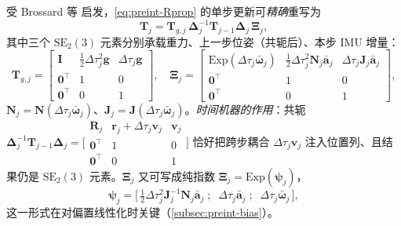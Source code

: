 \begin{derivation}
\label{deriv:preint-triple}
受 Brossard 等\cite{brossard2021associating} 启发，\cref{eq:preint-Rprop} 的单步更新可\emph{精确}重写为
\begin{equation}
  \mathbf{T}_j=\mathbf{T}_{g,j}\,\boldsymbol{\Delta}_j^{-1}\mathbf{T}_{j-1}\boldsymbol{\Delta}_j\,\boldsymbol{\Xi}_j,
  \label{eq:preint-meanprop}
\end{equation}
其中三个 $\mathrm{SE}_2(3)$ 元素分别承载重力、上一步位姿（共轭后）、本步 IMU 增量：
\begin{equation}
  \mathbf{T}_{g,j}=\begin{bmatrix}\mathbf{I}&\tfrac12\Delta\tau_j^2\mathbf{g}&\Delta\tau_j\mathbf{g}\\\mathbf{0}^\top&1&0\\\mathbf{0}^\top&0&1\end{bmatrix},\quad
  \boldsymbol{\Xi}_j=\begin{bmatrix}\mathrm{Exp}(\Delta\tau_j\bar{\boldsymbol{\omega}}_j)&\tfrac12\Delta\tau_j^2\mathbf{N}_j\bar{\mathbf{a}}_j&\Delta\tau_j\mathbf{J}_j\bar{\mathbf{a}}_j\\\mathbf{0}^\top&1&0\\\mathbf{0}^\top&0&1\end{bmatrix},
  \label{eq:preint-Tg-Xi}
\end{equation}
$\mathbf{N}_j=\mathbf{N}(\Delta\tau_j\bar{\boldsymbol{\omega}}_j)$、$\mathbf{J}_j=\mathbf{J}(\Delta\tau_j\bar{\boldsymbol{\omega}}_j)$。\emph{时间机器的作用}：共轭 $\boldsymbol{\Delta}_j^{-1}\mathbf{T}_{j-1}\boldsymbol{\Delta}_j=\big[\begin{smallmatrix}\mathbf{R}_j&\mathbf{r}_j+\Delta\tau_j\mathbf{v}_j&\mathbf{v}_j\\\mathbf{0}^\top&1&0\\\mathbf{0}^\top&0&1\end{smallmatrix}\big]$ 恰好把跨步耦合 $\Delta\tau_j\mathbf{v}_j$ 注入位置列、且结果仍是 $\mathrm{SE}_2(3)$ 元素。$\boldsymbol{\Xi}_j$ 又可写成纯指数 $\boldsymbol{\Xi}_j=\mathrm{Exp}(\boldsymbol{\psi}_j)$，
\begin{equation}
  \boldsymbol{\psi}_j=\big[\,\tfrac12\Delta\tau_j^2\mathbf{J}_j^{-1}\mathbf{N}_j\bar{\mathbf{a}}_j\;;\;\;\Delta\tau_j\bar{\mathbf{a}}_j\;;\;\;\Delta\tau_j\bar{\boldsymbol{\omega}}_j\,\big],
  \label{eq:preint-psi}
\end{equation}
这一形式在对偏置线性化时关键（\cref{subsec:preint-bias}）。
\end{derivation}


